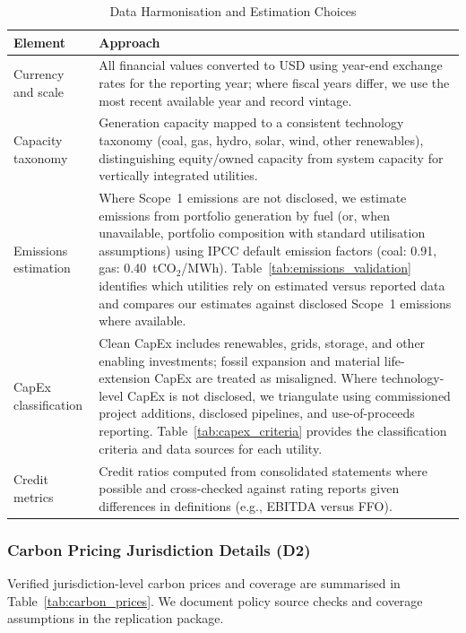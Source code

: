 \documentclass[review,3p,authoryear]{elsarticle}
\begin{document}
\begin{table}[htbp]
\centering
\caption{Data Harmonisation and Estimation Choices}
\label{tab:harmonisation}
\small
\begin{tabularx}{\textwidth}{lX}
\toprule
\textbf{Element} & \textbf{Approach} \\
\midrule
Currency and scale & All financial values converted to USD using year-end exchange rates for the reporting year; where fiscal years differ, we use the most recent available year and record vintage. \\
\addlinespace
Capacity taxonomy & Generation capacity mapped to a consistent technology taxonomy (coal, gas, hydro, solar, wind, other renewables), distinguishing equity/owned capacity from system capacity for vertically integrated utilities. \\
\addlinespace
Emissions estimation & Where Scope~1 emissions are not disclosed, we estimate emissions from portfolio generation by fuel (or, when unavailable, portfolio composition with standard utilisation assumptions) using IPCC default emission factors (coal: 0.91, gas: 0.40~tCO$_2$/MWh). Table~\ref{tab:emissions_validation} identifies which utilities rely on estimated versus reported data and compares our estimates against disclosed Scope~1 emissions where available. \\
\addlinespace
CapEx classification & Clean CapEx includes renewables, grids, storage, and other enabling investments; fossil expansion and material life-extension CapEx are treated as misaligned. Where technology-level CapEx is not disclosed, we triangulate using commissioned project additions, disclosed pipelines, and use-of-proceeds reporting. Table~\ref{tab:capex_criteria} provides the classification criteria and data sources for each utility. \\
\addlinespace
Credit metrics & Credit ratios computed from consolidated statements where possible and cross-checked against rating reports given differences in definitions (e.g., EBITDA versus FFO). \\
\bottomrule
\end{tabularx}
\end{table}

\subsubsection*{Carbon Pricing Jurisdiction Details (D2)}

Verified jurisdiction-level carbon prices and coverage are summarised in Table~\ref{tab:carbon_prices}. We document policy source checks and coverage assumptions in the replication package.
\end{document}
